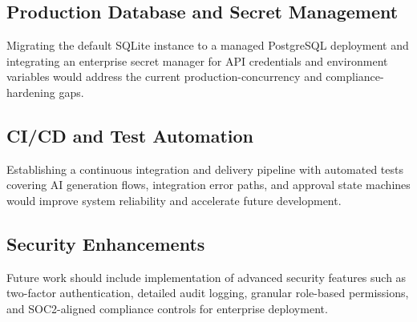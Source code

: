 \documentclass[12pt,a4paper]{report}
\begin{document}
\subsection{Production Database and Secret Management}
Migrating the default SQLite instance to a managed PostgreSQL deployment and integrating an enterprise secret manager for API credentials and environment variables would address the current production-concurrency and compliance-hardening gaps.

\subsection{CI/CD and Test Automation}
Establishing a continuous integration and delivery pipeline with automated tests covering AI generation flows, integration error paths, and approval state machines would improve system reliability and accelerate future development.

\subsection{Security Enhancements}
Future work should include implementation of advanced security features such as two-factor authentication, detailed audit logging, granular role-based permissions, and SOC2-aligned compliance controls for enterprise deployment.
\end{document}
